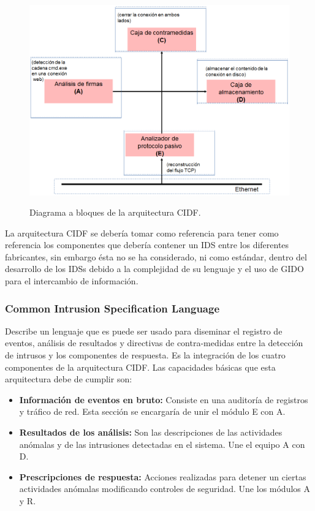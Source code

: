 	\begin{figure}
		\begin{center}
			\label{IDS}
			\includegraphics[scale=.4]{images/Arq_CIDF}
			\label{fig:IDS}
			\caption{Diagrama a bloques de la arquitectura CIDF.}
		\end{center}
	\end{figure}
	
	La arquitectura CIDF se debería tomar como referencia para tener como referencia los componentes que debería contener un IDS entre los diferentes fabricantes, sin embargo ésta no se ha considerado, ni como estándar, dentro del desarrollo de los IDSs debido a la complejidad de su lenguaje y el uso de GIDO para el intercambio de información.\\
	

	\subsubsection{Common Intrusion Specification Language}
	
	Describe un lenguaje que es puede ser usado para diseminar el registro de eventos, análisis de resultados y directivas de contra-medidas entre la detección de intrusos y los componentes de respuesta. Es la integración de los cuatro componentes de la arquitectura CIDF. Las capacidades básicas que esta arquitectura debe de cumplir son: \\
	
	\begin{itemize}
	
		\item \textbf{Información de eventos en bruto:} Consiste en una auditoría de registros y tráfico de red. Esta sección se encargaría de unir el módulo E con A.
		\item \textbf{Resultados de los análisis:} Son las descripciones de las actividades anómalas y de las intrusiones detectadas en el sistema. Une el equipo A con D.
		\item \textbf{Prescripciones de respuesta:} Acciones realizadas para detener un ciertas actividades anómalas modificando controles de seguridad. Une los módulos A y R.
		
	\end{itemize}
	
